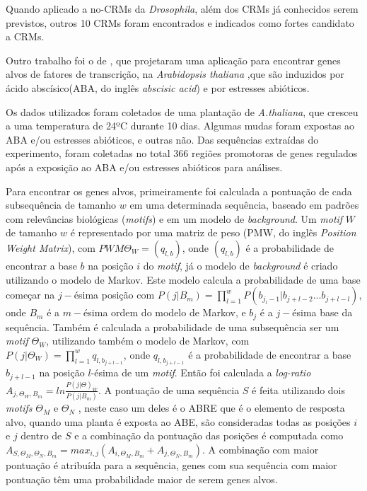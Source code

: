 Quando aplicado a no-CRMs da \textit{Drosophila}, além dos CRMs já conhecidos serem previstos, outros 10 CRMs foram encontrados e indicados como fortes candidato a CRMs.



Outro trabalho foi o de \cite{Zhang2005}, que projetaram uma aplicação para encontrar genes alvos de fatores de transcrição, na \textit{Arabidopsis thaliana} ,que são induzidos por ácido abscísico(ABA, do inglês \textit{abscisic acid}) e por estresses abióticos.

Os dados utilizados foram coletados de uma plantação de \textit{A.thaliana}, que cresceu a uma temperatura de 24ºC durante 10 dias. Algumas mudas foram expostas ao ABA e/ou estresses abióticos, e outras não. Das sequências extraídas do experimento, foram coletadas no total 366 regiões promotoras de genes regulados após a exposição ao ABA e/ou estresses abióticos para análises.

Para encontrar os genes alvos, primeiramente foi calculada a pontuação de cada subsequência de tamanho $w$ em uma determinada sequência, baseado em padrões com relevâncias biológicas (\textit{motifs}) e em um modelo de \textit{background}. Um \textit{motif} $W$ de tamanho $w$ é representado por uma matriz de peso (PMW, do inglês \textit{Position Weight Matrix}), com $PWM \Theta_{W} = (q_{l,b})$, onde $(q_{l,b})$ é a probabilidade de encontrar a base $b$ na posição $i$ do \textit{motif}, já o modelo de \textit{background} é criado utilizando o modelo de Markov. Este modelo calcula a probabilidade de uma base começar na $j-$ésima posição com $P(j|B_{m}) = \prod_{l=1}^wP(b_{j_l-1}|b_{j+l-2}...b_{j+l-l})$, onde $B_{m}$ é a $m-$ésima ordem do modelo de Markov, e $b_{j}$ é a $j-$ésima base da sequência. Também é calculada a probabilidade de uma subsequência ser um \textit{motif} $\Theta_{W}$, utilizando também o modelo de Markov, com $P(j|\Theta_{W}) = \prod_{l=1}^w q_{l,b_{j+l-1}}$, onde $q_{l,b_{j+l-1}}$ é a probabilidade de encontrar a base $b_{j+l-1}$ na posição $l$-ésima de um \textit{motif}. Então foi calculada a \textit{log-ratio} $A_{j,\Theta_{W},B_{m}} = ln\frac{P(j|\Theta)_{W}}{P(j|B_{m})}.$ A pontuação de uma sequência $S$ é feita utilizando dois \textit{motifs} $\Theta_{M}$ e $\Theta_{N}$ , neste caso um deles é o ABRE que é o elemento de resposta alvo, quando uma planta é exposta ao ABE, são consideradas todas as posições $i$ e $j$ dentro de $S$ e a combinação da pontuação das posições é computada como $A_{S,\Theta_{M},\Theta_{N},B_{m}} = max_{i,j}(A_{i,\Theta_{M},B_{m}} + A_{j,\Theta_{N},B_{m}})$. A combinação com maior pontuação é atribuída para a sequência, genes com sua sequência com maior pontuação têm uma probabilidade maior de serem genes alvos.

